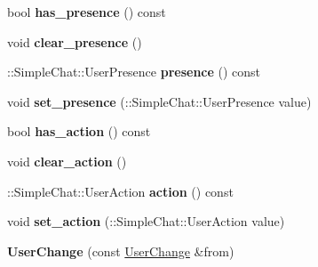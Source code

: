\begin{DoxyCompactItemize}
\item 
\hypertarget{classSimpleChat_1_1UserChange_a36742193656c807b42328554c201e235}{bool {\bfseries has\-\_\-presence} () const }\label{classSimpleChat_1_1UserChange_a36742193656c807b42328554c201e235}

\item 
\hypertarget{classSimpleChat_1_1UserChange_a6d4c1d5adf9d10d09c2a215bca19decd}{void {\bfseries clear\-\_\-presence} ()}\label{classSimpleChat_1_1UserChange_a6d4c1d5adf9d10d09c2a215bca19decd}

\item 
\hypertarget{classSimpleChat_1_1UserChange_a475263e38f342476d7f51ae30deefa2f}{\-::Simple\-Chat\-::\-User\-Presence {\bfseries presence} () const }\label{classSimpleChat_1_1UserChange_a475263e38f342476d7f51ae30deefa2f}

\item 
\hypertarget{classSimpleChat_1_1UserChange_a061d328b53eeed2086d667afd5c34c43}{void {\bfseries set\-\_\-presence} (\-::Simple\-Chat\-::\-User\-Presence value)}\label{classSimpleChat_1_1UserChange_a061d328b53eeed2086d667afd5c34c43}

\item 
\hypertarget{classSimpleChat_1_1UserChange_aa14e02408e53e75828bbf600eee9517e}{bool {\bfseries has\-\_\-action} () const }\label{classSimpleChat_1_1UserChange_aa14e02408e53e75828bbf600eee9517e}

\item 
\hypertarget{classSimpleChat_1_1UserChange_ac9fd66ee13bf8b3c0466fba0bd5862bd}{void {\bfseries clear\-\_\-action} ()}\label{classSimpleChat_1_1UserChange_ac9fd66ee13bf8b3c0466fba0bd5862bd}

\item 
\hypertarget{classSimpleChat_1_1UserChange_a64b1c7f20b5cd3c3ac434d8d6bfb7d55}{\-::Simple\-Chat\-::\-User\-Action {\bfseries action} () const }\label{classSimpleChat_1_1UserChange_a64b1c7f20b5cd3c3ac434d8d6bfb7d55}

\item 
\hypertarget{classSimpleChat_1_1UserChange_ac507bea0770e9937914ce5edbdff7263}{void {\bfseries set\-\_\-action} (\-::Simple\-Chat\-::\-User\-Action value)}\label{classSimpleChat_1_1UserChange_ac507bea0770e9937914ce5edbdff7263}

\item 
\hypertarget{classSimpleChat_1_1UserChange_a98ca1ff874642317f5f0ac5e1ae2dc30}{{\bfseries User\-Change} (const \hyperlink{classSimpleChat_1_1UserChange}{User\-Change} \&from)}\label{classSimpleChat_1_1UserChange_a98ca1ff874642317f5f0ac5e1ae2dc30}


\end{DoxyCompactItemize}
